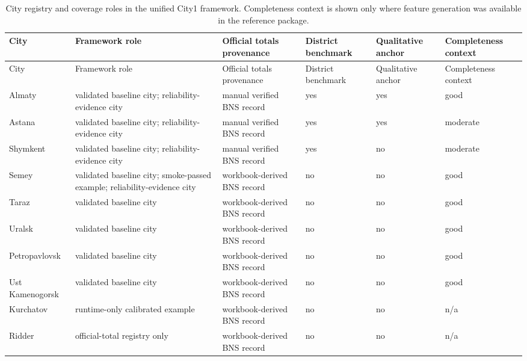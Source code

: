 \begingroup
\small
\setlength{\LTleft}{0pt}
\setlength{\LTright}{0pt}
\begin{longtable}{L{0.14\textwidth} L{0.20\textwidth} L{0.20\textwidth} L{0.12\textwidth} L{0.12\textwidth} L{0.12\textwidth}}
\caption{City registry and coverage roles in the unified City1 framework. Completeness context is shown only where feature generation was available in the reference package.}\label{tab:s4-city-registry}\\
\toprule
City & Framework role & Official totals provenance & District benchmark & Qualitative anchor & Completeness context \\
\midrule
\endfirsthead
\toprule
City & Framework role & Official totals provenance & District benchmark & Qualitative anchor & Completeness context \\
\midrule
\endhead
\bottomrule
\endfoot
Almaty & validated baseline city; reliability-evidence city & manual verified BNS record & yes & yes & good \\
Astana & validated baseline city; reliability-evidence city & manual verified BNS record & yes & yes & moderate \\
Shymkent & validated baseline city; reliability-evidence city & manual verified BNS record & yes & no & moderate \\
Semey & validated baseline city; smoke-passed example; reliability-evidence city & workbook-derived BNS record & no & no & good \\
Taraz & validated baseline city & workbook-derived BNS record & no & no & good \\
Uralsk & validated baseline city & workbook-derived BNS record & no & no & good \\
Petropavlovsk & validated baseline city & workbook-derived BNS record & no & no & good \\
Ust Kamenogorsk & validated baseline city & workbook-derived BNS record & no & no & good \\
Kurchatov & runtime-only calibrated example & workbook-derived BNS record & no & no & n/a \\
Ridder & official-total registry only & workbook-derived BNS record & no & no & n/a \\
\end{longtable}
\endgroup

